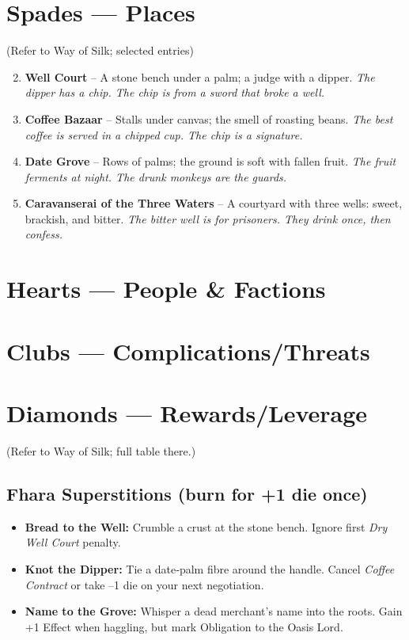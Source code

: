 \documentclass[11pt]{book}
\begin{document}
\section*{Spades — Places}
(Refer to Way of Silk; selected entries)
\begin{enumerate}
\setcounter{enumi}{1}
\item \textbf{Well Court} – A stone bench under a palm; a judge with a dipper. \textit{The dipper has a chip. The chip is from a sword that broke a well.}
\item \textbf{Coffee Bazaar} – Stalls under canvas; the smell of roasting beans. \textit{The best coffee is served in a chipped cup. The chip is a signature.}
\item \textbf{Date Grove} – Rows of palms; the ground is soft with fallen fruit. \textit{The fruit ferments at night. The drunk monkeys are the guards.}
\item \textbf{Caravanserai of the Three Waters} – A courtyard with three wells: sweet, brackish, and bitter. \textit{The bitter well is for prisoners. They drink once, then confess.}
\end{enumerate}

\section*{Hearts — People \& Factions}
\section*{Clubs — Complications/Threats}
\section*{Diamonds — Rewards/Leverage}
(Refer to Way of Silk; full table there.)

\subsection*{Fhara Superstitions (burn for +1 die once)}
\begin{itemize}
\item \textbf{Bread to the Well:} Crumble a crust at the stone bench. Ignore first \textit{Dry Well Court} penalty.
\item \textbf{Knot the Dipper:} Tie a date‑palm fibre around the handle. Cancel \textit{Coffee Contract} or take –1 die on your next negotiation.
\item \textbf{Name to the Grove:} Whisper a dead merchant’s name into the roots. Gain +1 Effect when haggling, but mark Obligation to the Oasis Lord.
\end{itemize}
\end{document}
